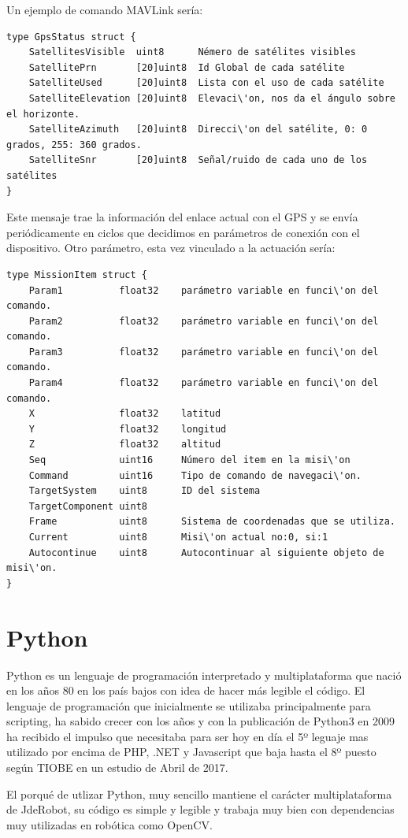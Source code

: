 Un ejemplo de comando MAVLink ser\'ia:
{\scriptsize
\begin{verbatim}
type GpsStatus struct {
    SatellitesVisible  uint8      Némero de satélites visibles
    SatellitePrn       [20]uint8  Id Global de cada satélite
    SatelliteUsed      [20]uint8  Lista con el uso de cada satélite
    SatelliteElevation [20]uint8  Elevaci\'on, nos da el ángulo sobre el horizonte.
    SatelliteAzimuth   [20]uint8  Direcci\'on del satélite, 0: 0 grados, 255: 360 grados.
    SatelliteSnr       [20]uint8  Señal/ruido de cada uno de los satélites
}
\end{verbatim}}
Este mensaje trae la informaci\'on del enlace actual con el GPS y se env\'ia peri\'odicamente en ciclos que decidimos en par\'ametros de conexi\'on con el dispositivo.
Otro par\'ametro, esta vez vinculado a la actuaci\'on ser\'ia:
{\scriptsize
\begin{verbatim}
type MissionItem struct {
    Param1          float32    parámetro variable en funci\'on del comando.
    Param2          float32    parámetro variable en funci\'on del comando.
    Param3          float32    parámetro variable en funci\'on del comando.
    Param4          float32    parámetro variable en funci\'on del comando.
    X               float32    latitud
    Y               float32    longitud
    Z               float32    altitud
    Seq             uint16     Número del item en la misi\'on
    Command         uint16     Tipo de comando de navegaci\'on.
    TargetSystem    uint8      ID del sistema
    TargetComponent uint8      
    Frame           uint8      Sistema de coordenadas que se utiliza.
    Current         uint8      Misi\'on actual no:0, si:1
    Autocontinue    uint8      Autocontinuar al siguiente objeto de misi\'on.
}
\end{verbatim}}

\section{Python}
\label{sec:python}

Python es un lenguaje de programaci\'on interpretado y multiplataforma que naci\'o en los años 80 en los país bajos con idea de hacer más legible el c\'odigo.
El lenguaje de programaci\'on que inicialmente se utilizaba principalmente para scripting, ha sabido crecer con los años y con la publicaci\'on de Python3 en 2009 ha recibido el impulso que necesitaba para ser hoy en día el 5º leguaje mas utilizado por encima de PHP, .NET y Javascript que baja hasta el 8º puesto según TIOBE en un estudio de Abril de 2017.

El porqué de utlizar Python, muy sencillo mantiene el carácter multiplataforma de JdeRobot, su c\'odigo es simple y legible y trabaja muy bien con dependencias muy utilizadas en rob\'otica como OpenCV.


\cleardoublepage